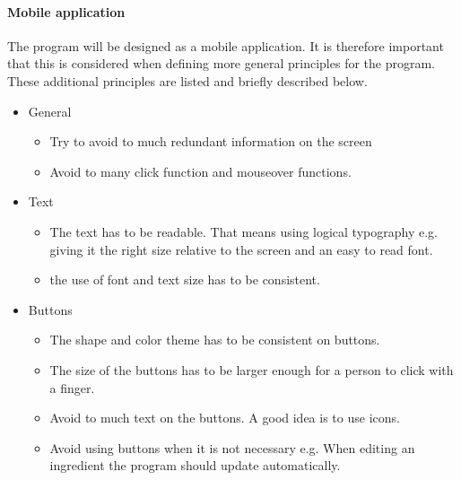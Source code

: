 \paragraph{Mobile application}
The program will be designed as a mobile application. It is therefore important that this is considered when defining more general principles for the program. These additional principles are listed and briefly described below.

\begin{itemize}
	\item General
		\begin{itemize}
			\item Try to avoid to much redundant information on the screen
			\item Avoid to many click function and mouseover functions.
		\end{itemize}
	\item Text
		\begin{itemize}
			\item The text has to be readable. That means using logical typography e.g. giving it the right size relative to the screen and an easy to read font.	
			\item the use of font and text size has to be consistent.
		\end{itemize}
	\item Buttons
		\begin{itemize}
			\item The shape and color theme has to be consistent on buttons.
			\item The size of the buttons has to be larger enough for a person to click with a finger.
			\item Avoid to much text on the buttons. A good idea is to use icons.
			\item Avoid using buttons when it is not necessary e.g. When editing an ingredient the program should update automatically.
		\end{itemize}
\end{itemize}    

